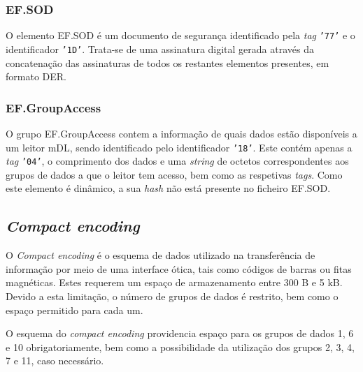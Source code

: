 \begin{table}[H]
\centering
\caption{Dados armazenados no EF.com}
\label{table:grupos_dados_ef_com}
\vspace{0.2cm}
\centering
{}\end{table}

\subsubsection{EF.SOD}

O elemento EF.SOD é um documento de segurança identificado pela \textit{tag} \texttt{'77'} e o identificador \texttt{'1D'}. Trata-se de uma assinatura digital gerada através da concatenação das assinaturas de todos os restantes elementos presentes, em formato DER. 

\subsubsection{EF.GroupAccess}

O grupo EF.GroupAccess contem a informação de quais dados estão disponíveis a um leitor mDL, sendo identificado pelo identificador \texttt{'18'}. Este contém apenas a \textit{tag} \texttt{'04'}, o comprimento dos dados e uma \textit{string} de octetos correspondentes aos grupos de dados a que o leitor tem acesso, bem como as respetivas \textit{tags}. Como este elemento é dinâmico, a sua \textit{hash} não está presente no ficheiro EF.SOD.

\subsection{\textit{Compact encoding}}

O \textit{Compact encoding} é o esquema de dados utilizado na transferência de informação por meio de uma interface ótica, tais como códigos de barras ou fitas magnéticas. Estes requerem um espaço de armazenamento entre 300 B e 5 kB. Devido a esta limitação, o número de grupos de dados é restrito, bem como o espaço permitido para cada um.

O esquema do \textit{compact encoding} providencia espaço para os grupos de dados 1, 6 e 10 obrigatoriamente, bem como a possibilidade da utilização dos grupos 2, 3, 4, 7 e 11, caso necessário.
